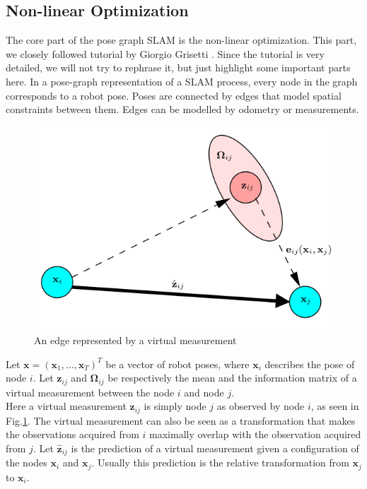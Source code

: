 \documentclass[twoside]{article}
\newcommand{\x}{\mathbf{x}}
\newcommand{\z}{\mathbf{z}}
\newcommand{\omg}{\mathbf{\Omega}}
\begin{document}
\begin{multicols}{2}
\subsection{Non-linear Optimization}
The core part of the pose graph SLAM is the non-linear optimization. This part, we closely followed tutorial by Giorgio Grisetti \cite{Giorgio10}. Since the tutorial is very detailed, we will not try to rephrase it, but just highlight some important parts here.
In a pose-graph representation of a SLAM process, every node in the graph corresponds to a robot pose. Poses are connected by edges that model spatial constraints between them. Edges can be modelled by odometry or measurements.
\begin{figure}[H]
\centering
\includegraphics[width=\columnwidth]{fig/virtual_meas.png}
\caption{An edge represented by a virtual measurement}
\label{fig:virtual_meas}
\end{figure}
Let $\x = (\x_1, \ldots, \x_T)^T$ be a vector of robot poses, where $\x_i$ describes the pose of node $i$. Let $\z_{ij}$ and $\omg_{ij}$ be respectively the mean and the information matrix of a virtual measurement between the node $i$ and node $j$. \\
Here a virtual measurement $\z_{ij}$ is simply node $j$ as observed by node $i$, as seen in Fig.\ref{fig:virtual_meas}. The virtual measurement can also be seen as a transformation that makes the observations acquired from $i$ maximally overlap with the observation acquired from $j$. Let $\hat{\z}_{ij}$ is the prediction of a virtual measurement given a configuration of the nodes $\x_i$ and $\x_j$. Usually this prediction is the relative transformation from $\x_j$ to $\x_i$.\\

\end{multicols}
\end{document}
